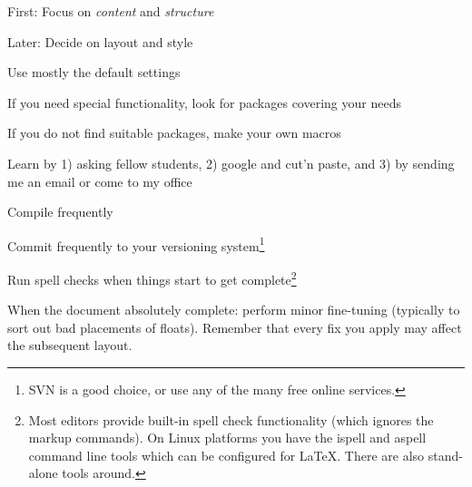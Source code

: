 \begin{compactitem}
\item First: Focus on {\em content} and {\em structure} 
\item Later: Decide on layout and style
\item Use mostly the default settings
\item If you need special functionality, look for packages covering your needs
\item If you do not find suitable packages, make your own macros
\item Learn by 1) asking fellow students, 2) google and cut'n paste, and 3) by sending me an email or come to my office
\item Compile frequently
\item Commit frequently to your versioning system\footnote{SVN is a good choice, or use any of the many free online services.}
\item Run spell checks when things start to get complete\footnote{Most editors provide built-in spell check functionality (which ignores the markup commands).  On Linux platforms you have the ispell and aspell command line tools which can be configured for \LaTeX. There are also stand-alone tools around.}
\item When the document absolutely complete: perform minor fine-tuning (typically to sort out bad placements of floats). Remember that every fix you apply may affect the subsequent layout.
\end{compactitem}



